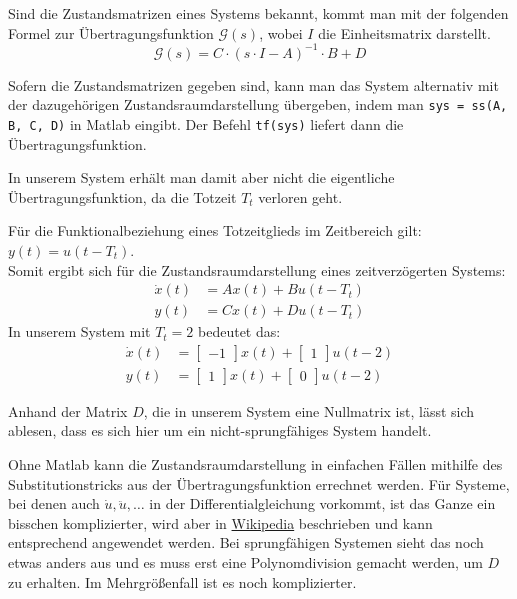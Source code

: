 Sind die Zustandsmatrizen eines Systems bekannt, kommt man mit der folgenden Formel zur Übertragungsfunktion $\mathcal{G}(s)$, wobei $I$ die Einheitsmatrix darstellt.
\[
    \mathcal{G}(s) = C\cdot (s \cdot I - A)^{-1} \cdot B + D
\]

Sofern die Zustandsmatrizen gegeben sind, kann man das System alternativ mit der dazugehörigen Zustandsraumdarstellung übergeben, indem man \texttt{sys = ss(A, B, C, D)} in Matlab eingibt. Der Befehl \texttt{tf(sys)} liefert dann die Übertragungsfunktion.

In unserem System erhält man damit aber nicht die eigentliche Übertragungsfunktion, da die Totzeit $T_t$ verloren geht.

Für die Funktionalbeziehung eines Totzeitglieds im Zeitbereich gilt: $y(t) = u(t-T_t)$. \\
Somit ergibt sich für die Zustandsraumdarstellung eines zeitverzögerten Systems:
\begin{align*}
    \dot x(t) & = Ax(t) + Bu(t - T_t) \nonumber \\
    y(t) & = Cx(t) + Du(t - T_t)
\end{align*}
In unserem System mit $T_t = 2$ bedeutet das:
\begin{align*}
    \dot x(t) & = \begin{bmatrix}
        -1
    \end{bmatrix}x(t) + \begin{bmatrix}
        1
    \end{bmatrix}u(t - 2) \nonumber \\
    y(t) & = \begin{bmatrix}
        1
    \end{bmatrix}x(t) + \begin{bmatrix}
        0
    \end{bmatrix}u(t - 2)
\end{align*}

Anhand der Matrix $D$, die in unserem System eine Nullmatrix ist, lässt sich ablesen, dass es sich hier um ein nicht-sprungfähiges System handelt.

Ohne Matlab kann die Zustandsraumdarstellung in einfachen Fällen mithilfe des Substitutionstricks aus der Übertragungsfunktion errechnet werden. Für Systeme, bei denen auch $\dot u, \ddot u, \ldots$ in der Differentialgleichung vorkommt, ist das Ganze ein bisschen komplizierter, wird aber in \href{https://de.wikipedia.org/wiki/Zustandsraumdarstellung#Regelungsnormalform}{Wikipedia} beschrieben und kann entsprechend angewendet werden. Bei sprungfähigen Systemen sieht das noch etwas anders aus und es muss erst eine Polynomdivision gemacht werden, um $D$ zu erhalten. Im Mehrgrößenfall ist es noch komplizierter.

